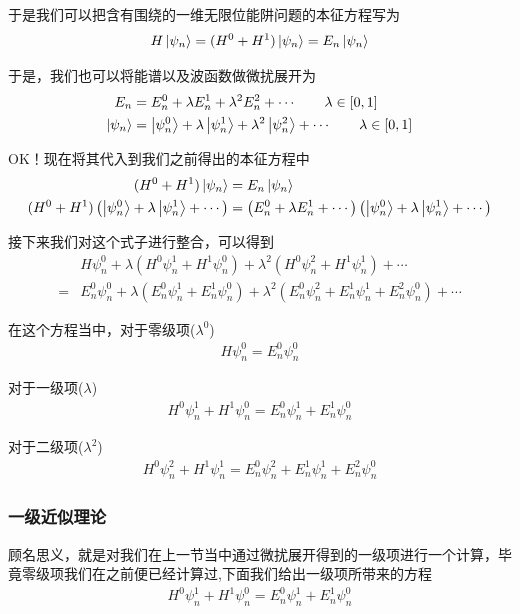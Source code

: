 \documentclass{article}
\begin{document}
于是我们可以把含有围绕的一维无限位能阱问题的本征方程写为
\begin{align*}
    H\ket{\psi_n}=(H^0+H^1)\ket{\psi_n}=E_n\ket{\psi_n}
\end{align*}

于是，我们也可以将能谱以及波函数做微扰展开为
\begin{align*}
    E_n&=E_n^0+\lambda E_n^1+\lambda^2 E_n^2+\cdots\quad\quad \lambda\in[0,1]\\
    \ket{\psi_n}&=\ket{\psi_n^0}+\lambda\ket{\psi_n^1}+\lambda^2\ket{\psi_n^2}+\cdots\quad\quad \lambda\in[0,1]
\end{align*}

OK！现在将其代入到我们之前得出的本征方程中
\begin{align*}
    (H^0+H^1)\ket{\psi_n}&=E_n\ket{\psi_n}\\
    (H^0+H^1)\left(\ket{\psi_n^0}+\lambda\ket{\psi_n^1}+\cdots\right)&=\left(E_n^0+\lambda E_n^1+\cdots\right)\left(\ket{\psi_n^0}+\lambda\ket{\psi_n^1}+\cdots\right)
\end{align*}

接下来我们对这个式子进行整合，可以得到
\begin{align*}
    &H\psi_n^0+\lambda\left(H^0\psi_n^1+H^1\psi_n^0\right)+\lambda^2\left(H^0\psi_n^2+H^1\psi_n^1\right)+\cdots\\
    =&E_n^0\psi_n^0+\lambda\left(E_n^0\psi_n^1+E_n^1\psi_n^0\right)+\lambda^2\left(E_n^0\psi_n^2+E_n^1\psi_n^1+E_n^2\psi_n^0\right)+\cdots
\end{align*}

在这个方程当中，对于零级项($\lambda^0$)
\begin{align*}
    H\psi_n^0=E_n^0\psi_n^0
\end{align*}

对于一级项($\lambda$)
\begin{align*}
    H^0\psi_n^1+H^1\psi_n^0=E_n^0\psi_n^1+E_n^1\psi_n^0
\end{align*}

对于二级项($\lambda^2$)
\begin{align*}
    H^0\psi_n^2+H^1\psi_n^1=E_n^0\psi_n^2+E_n^1\psi_n^1+E_n^2\psi_n^0
\end{align*}

\subsubsection{一级近似理论}
顾名思义，就是对我们在上一节当中通过微扰展开得到的一级项进行一个计算，毕竟零级项我们在之前便已经计算过,下面我们给出一级项所带来的方程
\begin{align*}
    H^0\psi_n^1+H^1\psi_n^0=E_n^0\psi_n^1+E_n^1\psi_n^0
\end{align*}
\end{document}
